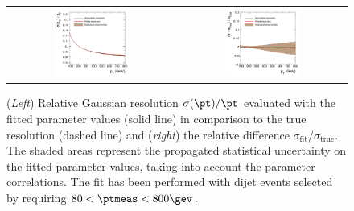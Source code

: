 \begin{figure}[ht]
  \begin{center}
    \begin{tabular}{cc}
     \includegraphics[width=0.45\textwidth]{figures/resFit_ToyMC_PtCuts_Sigma} &
     \includegraphics[width=0.45\textwidth]{figures/resFit_ToyMC_PtCuts_SigmaRelDifference} \\
   \end{tabular}
 \end{center}
  \caption{(\textit{Left}) Relative Gaussian resolution $\sigma(\pt)/\pt$ evaluated with the fitted
    parameter values (solid line) in comparison to the true resolution
    (dashed line) and (\textit{right}) the relative difference
    $\sigma_{\text{fit}} / \sigma_{\text{true}}$.
    The shaded areas represent the propagated statistical
    uncertainty on the fitted parameter values, taking into account the
    parameter correlations.
    The fit has been performed with dijet events selected by requiring \mbox{$80 < \ptmeas < 800\gev$}.}
  \label{fig:ResFit:ToyMC:PtCuts:FittedSigma}
\end{figure}



